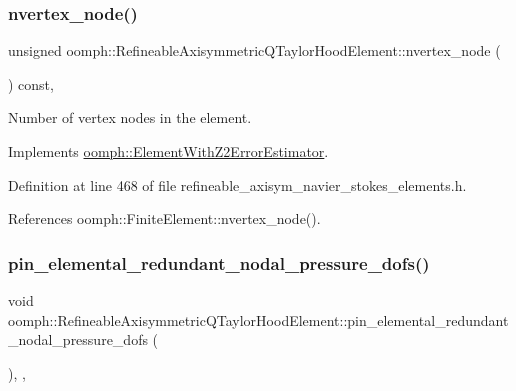 \subsubsection{\texorpdfstring{nvertex\+\_\+node()}{nvertex\_node()}}
{\footnotesize\ttfamily unsigned oomph\+::\+Refineable\+Axisymmetric\+Q\+Taylor\+Hood\+Element\+::nvertex\+\_\+node (\begin{DoxyParamCaption}{ }\end{DoxyParamCaption}) const\hspace{0.3cm}{\ttfamily [inline]}, {\ttfamily [virtual]}}



Number of vertex nodes in the element. 



Implements \hyperlink{classoomph_1_1ElementWithZ2ErrorEstimator_a19495a0e77ef4ff35f15fdf7913b4077}{oomph\+::\+Element\+With\+Z2\+Error\+Estimator}.



Definition at line 468 of file refineable\+\_\+axisym\+\_\+navier\+\_\+stokes\+\_\+elements.\+h.



References oomph\+::\+Finite\+Element\+::nvertex\+\_\+node().

\mbox{\label{classoomph_1_1RefineableAxisymmetricQTaylorHoodElement_a14e45b922f221125dcfccae8817e1534}} 
\subsubsection{\texorpdfstring{pin\+\_\+elemental\+\_\+redundant\+\_\+nodal\+\_\+pressure\+\_\+dofs()}{pin\_elemental\_redundant\_nodal\_pressure\_dofs()}}
{\footnotesize\ttfamily void oomph\+::\+Refineable\+Axisymmetric\+Q\+Taylor\+Hood\+Element\+::pin\+\_\+elemental\+\_\+redundant\+\_\+nodal\+\_\+pressure\+\_\+dofs (\begin{DoxyParamCaption}{ }\end{DoxyParamCaption})\hspace{0.3cm}{\ttfamily [inline]}, {\ttfamily [private]}, {\ttfamily [virtual]}}



